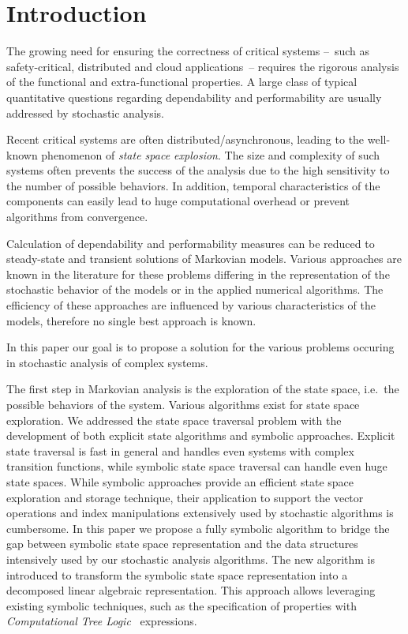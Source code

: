 \chapter{Introduction}
\label{chap:introduction}

The growing need for ensuring the correctness of critical systems --~such as
safety-critical, distributed and cloud applications~-- requires the
rigorous analysis of the functional and extra-functional properties.
A large class of typical quantitative questions regarding
dependability and performability are usually addressed by stochastic
analysis.

Recent critical systems are often distributed/asynchronous, leading to
the well-known phenomenon of \emph{state space explosion}. The size
and complexity of such systems often prevents the success of the
analysis due to the high sensitivity to the number of possible
behaviors. In addition, temporal characteristics of the components can
easily lead to huge computational overhead or prevent algorithms from convergence.

Calculation of dependability and performability measures can be
reduced to steady-state and transient solutions of Markovian
models. Various approaches are known in the literature for these
problems differing in the representation of the stochastic behavior of
the models or in the applied numerical algorithms. The efficiency of
these approaches are influenced by various characteristics of the
models, therefore no single best approach is known.

In this paper our goal is to propose a solution for the various
problems occuring in stochastic analysis of complex systems.

The first step in Markovian analysis is the exploration of the state
space, i.e.~the possible behaviors of the system. 
Various algorithms exist for state space exploration. We addressed the
state space traversal problem with the
development of both explicit state algorithms and symbolic
approaches. Explicit state traversal is fast in general and handles
even systems with complex transition functions, while symbolic state
space traversal can handle even huge state spaces. While symbolic approaches
provide an efficient state space exploration and storage technique,
their application to support the vector operations and index
manipulations extensively used by stochastic algorithms is cumbersome.
In this paper we propose a fully symbolic algorithm to bridge the gap between
symbolic state space representation and the data structures
intensively used by our stochastic analysis algorithms.
The new algorithm is introduced to transform the
symbolic state space representation into a decomposed linear algebraic
representation. This approach allows leveraging existing symbolic
techniques, such as the specification of properties with
\emph{Computational Tree Logic}~ expressions.

